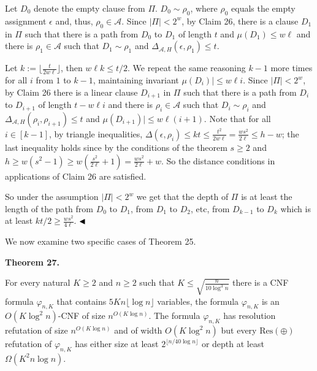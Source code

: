 \documentclass[10pt,a4paper]{article}
\begin{document}
Let $D_{0}$ denote the empty clause from $\Pi$.
$D_{0}\sim\rho_{0}$, where $\rho_{0}$ equals the empty assignment $\epsilon$ and, thus, $\rho_{0}\in\mathcal{A}$.
Since $|\Pi|<2^{w}$, by Claim 26, there is a clause $D_{1}$ in $\Pi$ such that there is a path from
$D_{0}$ to $D_{1}$ of length $t$ and $\mu(D_{1})\leq w\ell$ and there is $\rho_{1}\in\mathcal{A}$ such that
$D_{1}\sim\rho_{1}$ and $\Delta_{\mathcal{A},H}(\epsilon,\rho_{1})\leq t$.\par



Let $k:=\lfloor\frac{t}{2w\ell}\rfloor$, then $w\ell k\leq t/2$.
We repeat the same reasoning $k-1$ more times for all $i$ from $1$ to $k-1$, maintaining invariant $\mu(D_{i})|\leq w\ell i$.
Since $|\Pi|<2^{w}$, by Claim 26 there is a linear clause $D_{i+1}$ in $\Pi$ such that there is a path from $D_{i}$
to $D_{i+1}$ of length $t-w\ell i$ and there is $\rho_{i}\in\mathcal{A}$ such that $D_{i}\sim\rho_{i}$ and
$\Delta_{\mathcal{A},H}(\rho_{i},\rho_{i+1})\leq t$ and $\mu(D_{i+1})|\leq w\ell(i+1)$.
Note that for all $i\in[k-1]$, by triangle inequalities,
$\Delta(\epsilon,\rho_{i})\leq kt\leq\frac{t^{2}}{2w\ell}=\frac{ws^{2}}{2\ell}\leq h-w$;
the last inequality holds since by the conditions of the theorem $s\geq 2$ and
$h\geq w(s^{2}-1)\geq w(\frac{s^{2}}{2\ell}+1)=\frac{ws^{2}}{2\ell}+w$. So the distance conditions in applications of
Claim 26 are satisfied.\par



So under the assumption $|\Pi|<2^{w}$ we get that the depth of $\Pi$ is at least the length of the path from
$D_{0}$ to $D_{1}$, from $D_{1}$ to $D_{2}$, etc, from $D_{k-1}$ to $D_{k}$ which is at least $kt/2\geq\frac{ws^{2}}{4\ell}$.
$\hfill\blacktriangleleft$\par



We now examine two specific cases of Theorem 25.\par




\par\medskip\noindent\textbf{
Theorem 27.
}\par



For every natural $K\geq 2$ and $n\geq 2$ such that $K\leq\sqrt{\frac{n}{10\log^{3}n}}$ there is a CNF formula
$\varphi_{n,K}$ that contains $5Kn\lfloor\log n\rfloor$ variables, the formula $\varphi_{n,K}$ is an
$O(K\log^{2}n)$-CNF of size $n^{O(K\log n)}$.
The formula $\varphi_{n,K}$ has resolution refutation of size $n^{O(K\log n)}$ and of width $O(K\log^{2}n)$
but every $\mathrm{Res}(\oplus)$ refutation of $\varphi_{n,K}$ has either size at least $2^{\lfloor n/40\log n\rfloor}$ or depth at least
$\Omega(K^{2}n\log n)$.\par
\end{document}
